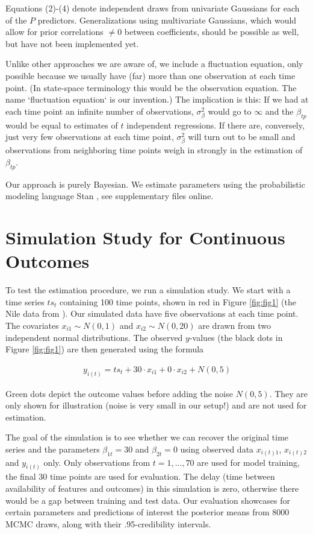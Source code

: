 \documentclass{article}
\begin{document}
Equations (2)-(4) denote independent draws from univariate Gaussians for each of the $P$ predictors. Generalizations using multivariate Gaussians, which would allow for prior correlations $\neq 0$ between coefficients, should be possible as well, but have not been implemented yet.

Unlike other approaches we are aware of, we include a fluctuation equation, only possible because we usually have (far) more than one observation at each time point. (In state-space terminology this would be the observation equation. The name `fluctuation equation` is our invention.) The implication is this: If we had at each time point an infinite number of observations, $\sigma^2_\beta$ would go to $\infty$ and the $\beta_{tp}$ would be equal to estimates of $t$ independent regressions. If there are, conversely, just very few observations at each time point, $\sigma^2_\beta$ will turn out to be small and observations from neighboring time points weigh in strongly in the estimation of $\beta_{tp}$.

Our approach is purely Bayesian. We estimate parameters using the probabilistic modeling language Stan \citep{stan_development_team_rstan_2021}, see supplementary files online.

\section{Simulation Study for Continuous Outcomes}

To test the estimation procedure, we run a simulation study. We start with a time series $ts_t$ containing 100 time points, shown in red in Figure \ref{fig:fig1} (the Nile data from \citep{durbin_time_2012}). Our simulated data have five observations at each time point. The covariates $x_{i1} \sim N(0,1)$ and $x_{i2} \sim N(0, 20)$ are drawn from two independent normal distributions. The observed $y$-values (the black dots in Figure \ref{fig:fig1}) are then generated using the formula

\begin{align}
y_{i(t)} = ts_t + 30 \cdot x_{i1} + 0 \cdot x_{i2} + N(0, 5)    
\end{align}

Green dots depict the outcome values before adding the noise $N(0, 5)$. They are only shown for illustration (noise is very small in our setup!) and are not used for estimation.

The goal of the simulation is to see whether we can recover the original time series and the parameters $\beta_{1t} = 30$ and $\beta_{2t} = 0$ using observed data $x_{i(t)1}$, $x_{i(t)2}$ and $y_{i(t)}$ only. Only observations from $t = 1, ..., 70$ are used for model training, the final 30 time points are used for evaluation. The delay (time between availability of features and outcomes) in this simulation is zero, otherwise there would be a gap between training and test data. Our evaluation showcases for certain parameters and predictions of interest the posterior means from 8000 MCMC draws, along with their .95-credibility intervals.
\end{document}
